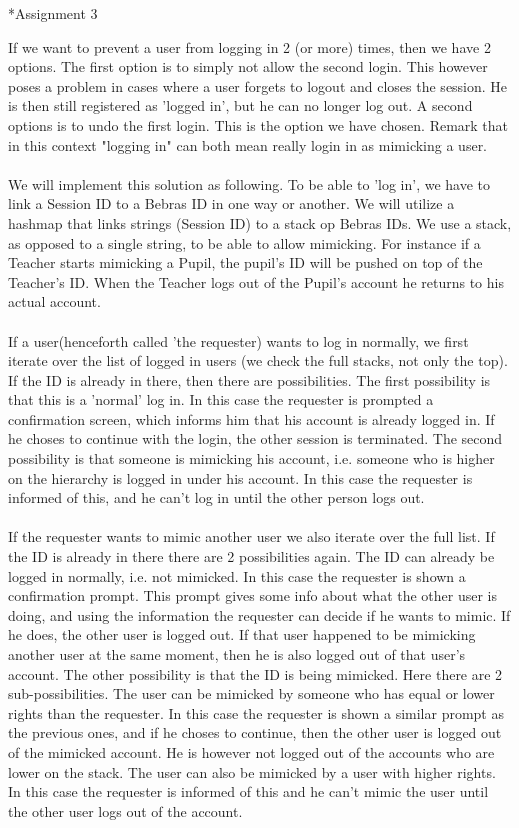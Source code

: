 
\begin{section}*{Assignment 3}

If we want to prevent a user from logging in 2 (or more) times, then we have 2 options. The first option is to simply not allow the second login. This however poses a problem in cases where a user forgets to logout and closes the session. He is then still registered as 'logged in', but he can no longer log out. A second options is to undo the first login. This is the option we have chosen. Remark that in this context "logging in" can both mean really login in as mimicking a user.
\\\\
We will implement this solution as following. To be able to 'log in', we have to link a Session ID to a Bebras ID in one way or another. We will utilize a hashmap that links strings (Session ID) to a stack op Bebras IDs. We use a stack, as opposed to a single string, to be able to allow mimicking. For instance if a Teacher starts mimicking a Pupil, the pupil's ID will be pushed on top of the Teacher's ID. When the Teacher logs out of the Pupil's account he returns to his actual account.
\\\\
If a user(henceforth called 'the requester) wants to log in normally, we first iterate over the list of logged in users (we check the full stacks, not only the top). If the ID is already in there, then there are possibilities. The first possibility is that this is a 'normal' log in. In this case the requester is prompted a confirmation screen, which informs him that his account is already logged in. If he choses to continue with the login, the other session is terminated. The second possibility is that someone is mimicking his account, i.e. someone who is higher on the hierarchy is logged in under his account. In this case the requester is informed of this, and he can't log in until the other person logs out.
\\\\
If the requester wants to mimic another user we also iterate over the full list. If the ID is already in there there are 2 possibilities again. The ID can already be logged in normally, i.e. not mimicked. In this case the requester is shown a confirmation prompt. This prompt gives some info about what the other user is doing, and using the information the requester can decide if he wants to mimic. If he does, the other user is logged out. If that user happened to be mimicking another user at the same moment, then he is also logged out of that user's account. The other possibility is that the ID is being mimicked. Here there are 2 sub-possibilities. The user can be mimicked by someone who has equal or lower rights than the requester. In this case the requester is shown a similar prompt as the previous ones, and if he choses to continue, then the other user is logged out of the mimicked account. He is however not logged out of the accounts who are lower on the stack. The user can also be mimicked by a user with higher rights. In this case the requester is informed of this and he can't mimic the user until the other user logs out of the account.

\end{section}
